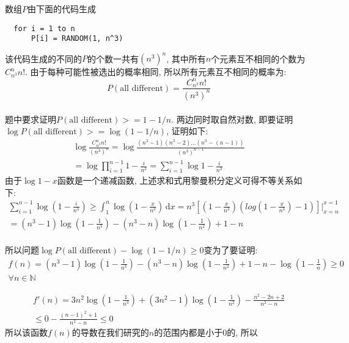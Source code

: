 \documentclass[paper=a4, fontsize=11pt]{scrartcl} %
\numberwithin{equation}{section} %
\numberwithin{figure}{section} %
\numberwithin{table}{section} %
\begin{document}
数组$P$由下面的代码生成
\begin{lstlisting}
  for i = 1 to n
      P[i] = RANDOM(1, n^3)
\end{lstlisting}
该代码生成的不同的$P$的个数一共有${(n^3)}^n$, 其中所有$n$个元素互不相同的个数为$C_{n^3}^{n} n!$. 由于每种可能性被选出的概率相同, 所以所有元素互不相同的概率为:
\[
P(\mbox{all different}) = \frac{C_{n^3}^{n} n!}{{(n^3)}^n}
\]
\\[2ex]
题中要求证明$P(\mbox{all different}) >= 1 - 1/n$. 两边同时取自然对数, 即要证明$\log{P(\mbox{all different})} >= \log(1 - 1/n)$, 证明如下:
\begin{equation}
  \begin{split}
    \log \frac{C_{n^3}^{n} n!}{{(n^3)}^n} = \log \frac{(n^3 - 1)(n^3 - 2)\dots(n^3 - (n - 1))}{{(n^3)}^{n-1}} \\
    = \log{\prod_{i=1}^{n-1} 1 - \frac{i}{n^3}} = \sum_{i=1}^{n-1}{\log{1 - \frac{i}{n^3}}}
  \end{split}
\end{equation}
由于$\log{1-x}$函数是一个递减函数, 上述求和式用黎曼积分定义可得不等关系如下:
\begin{equation}
  \begin{split}
    \sum_{i=1}^{n-1}{\log{(1 - \frac{i}{n^3})}} \geq \int_1^n \log{(1-\frac{x}{n^3})} \,\mathrm{d}x
    = n^3[(1 - \frac{x}{n^3})(log(1 - \frac{x}{n^3}) - 1)]|_{x = n}^{x = 1} \\
    = (n^3 - 1)\log{(1-\frac{1}{n^3})} - (n^3 - n)\log{(1 - \frac{1}{n^2})} + 1 - n
  \end{split}
\end{equation}
\\[2ex]
所以问题$\log{P(\mbox{all different})} - \log{(1 - 1/n)} \geq 0$变为了要证明:
\begin{equation}
  \begin{split}
    f(n) = (n^3 - 1)\log{(1-\frac{1}{n^3})} - (n^3 - n)\log{(1 - \frac{1}{n^2})} + 1 - n - \log{(1 - \frac{1}{n})} \geq 0 \\
    \forall n \in \mathbb{N}
  \end{split}
\end{equation}

\begin{equation}
  \begin{split}
f'(n) = 3n^2\log{(1-\frac{1}{n^3})} + (3n^2 - 1)\log{(1-\frac{1}{n^2})} - \frac{n^2 -2n + 2}{n^2 - n} \\
\leq 0 - \frac{(n-1)^2 + 1}{n^2 - n} \leq 0
  \end{split}
\end{equation}
所以该函数$f(n)$的导数在我们研究的$n$的范围内都是小于0的, 所以
\end{document}
